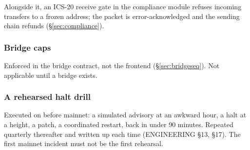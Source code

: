 Alongside it, an ICS-20 receive gate in the compliance module refuses incoming
transfers to a frozen address; the packet is error-acknowledged and the sending
chain refunds (\S\ref{sec:compliance}).

\subsubsection{Bridge caps}

Enforced in the bridge contract, not the frontend (\S\ref{sec:bridgeseq}). Not
applicable until a bridge exists.

\subsubsection{A rehearsed halt drill}

Executed on  before mainnet: a simulated advisory at an awkward
hour, a halt at a height, a patch, a coordinated restart, back in under 90
minutes. Repeated quarterly thereafter and written up each time (ENGINEERING
\S13, \S17). The first mainnet incident must not be the first rehearsal.
